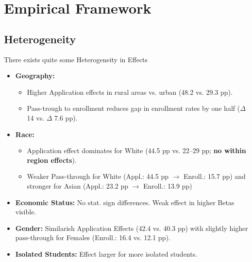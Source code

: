 \section{Empirical Framework} 

\subsection{Heterogeneity}
\begin{frame}{There exists quite some Heterogeneity in Effects}
\label{Slide12}
\begin{itemize}

\item \textbf{Geography: \hfill  \hyperlink{Slide12}{}} 
\begin{itemize}
\item Higher Application effects in rural areas  vs. urban (48.2 vs. 29.3 pp). 
\item Pass-trough to enrollment reduces gap in enrollment rates by one half ($\Delta$ 14 vs. $\Delta$ 7.6 pp).
\end{itemize}
\vfill \pause
\item \textbf{Race: \hfill \hyperlink{Slide12}{}} 
\begin{itemize}
\item Application effect dominates for White (44.5 pp vs. 22--29 pp; \textbf{no within region effects}). 
\item Weaker Pass-through for White (Appl.: 44.5 pp $\rightarrow$ Enroll.: 15.7 pp) and stronger for Asian (Appl.: 23.2 pp $\rightarrow$ Enroll.: 13.9 pp)

\end{itemize}
\vfill \pause

\item \textbf{Economic Status:} No stat. sign differences. Weak effect in higher Betas visible. \hfill \hyperlink{Slide12}{}

\vfill \pause

\item \textbf{Gender:} Similarish Application Effects (42.4 vs. 40.3 pp) with slightly higher pass-through for Females (Enroll.: 16.4 vs. 12.1 pp).  \hfill \hyperlink{Slide12}{}

\vfill \pause

\item \textbf{Isolated Students:} Effect larger for more isolated students. \hfill \hyperlink{Slide12}{}


\end{itemize}
\end{frame}

